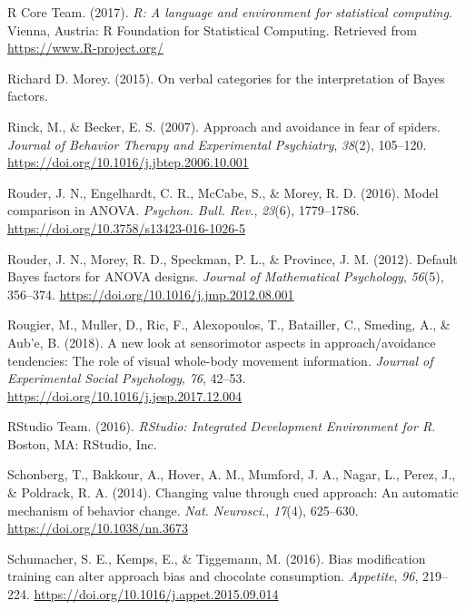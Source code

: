 \documentclass[man,floatsintext]{apa6}
\begin{document}
\leavevmode\hypertarget{ref-R-base}{}%
R Core Team. (2017). \emph{R: A language and environment for statistical computing}. Vienna, Austria: R Foundation for Statistical Computing. Retrieved from \url{https://www.R-project.org/}

\leavevmode\hypertarget{ref-richard_d._morey_verbal_2015-1}{}%
Richard D. Morey. (2015). On verbal categories for the interpretation of Bayes factors.

\leavevmode\hypertarget{ref-rinck_approach_2007}{}%
Rinck, M., \& Becker, E. S. (2007). Approach and avoidance in fear of spiders. \emph{Journal of Behavior Therapy and Experimental Psychiatry}, \emph{38}(2), 105--120. \url{https://doi.org/10.1016/j.jbtep.2006.10.001}

\leavevmode\hypertarget{ref-rouder_model_2016}{}%
Rouder, J. N., Engelhardt, C. R., McCabe, S., \& Morey, R. D. (2016). Model comparison in ANOVA. \emph{Psychon. Bull. Rev.}, \emph{23}(6), 1779--1786. \url{https://doi.org/10.3758/s13423-016-1026-5}

\leavevmode\hypertarget{ref-rouder_default_2012}{}%
Rouder, J. N., Morey, R. D., Speckman, P. L., \& Province, J. M. (2012). Default Bayes factors for ANOVA designs. \emph{Journal of Mathematical Psychology}, \emph{56}(5), 356--374. \url{https://doi.org/10.1016/j.jmp.2012.08.001}

\leavevmode\hypertarget{ref-rougier_new_2018}{}%
Rougier, M., Muller, D., Ric, F., Alexopoulos, T., Batailler, C., Smeding, A., \& Aub\a'e, B. (2018). A new look at sensorimotor aspects in approach/avoidance tendencies: The role of visual whole-body movement information. \emph{Journal of Experimental Social Psychology}, \emph{76}, 42--53. \url{https://doi.org/10.1016/j.jesp.2017.12.004}

\leavevmode\hypertarget{ref-rstudio}{}%
RStudio Team. (2016). \emph{RStudio: Integrated Development Environment for R}. Boston, MA: RStudio, Inc.

\leavevmode\hypertarget{ref-schonberg_changing_2014}{}%
Schonberg, T., Bakkour, A., Hover, A. M., Mumford, J. A., Nagar, L., Perez, J., \& Poldrack, R. A. (2014). Changing value through cued approach: An automatic mechanism of behavior change. \emph{Nat. Neurosci.}, \emph{17}(4), 625--630. \url{https://doi.org/10.1038/nn.3673}

\leavevmode\hypertarget{ref-schumacher_bias_2016}{}%
Schumacher, S. E., Kemps, E., \& Tiggemann, M. (2016). Bias modification training can alter approach bias and chocolate consumption. \emph{Appetite}, \emph{96}, 219--224. \url{https://doi.org/10.1016/j.appet.2015.09.014}
\end{document}
